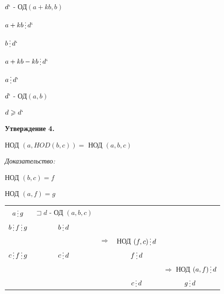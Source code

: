 \documentclass[12pt]{article}
\begin{document}
\begin{enumerate}
          $d`$ - ОД$(a+kb,b)$\par
          $a+kb \mathop{\raisebox{-2pt}{\vdots}} d`$\par
          $b \mathop{\raisebox{-2pt}{\vdots}} d`$\par
          $a +kb-kb \mathop{\raisebox{-2pt}{\vdots}} d`$\par
          $a \mathop{\raisebox{-2pt}{\vdots}} d`$\par
          $d`$ - ОД$(a,b)$\par
          $d \geqslant d`$\par
\end{enumerate}\par

\textbf{Утверждение 4.}\par
НОД $(a, HOD(b,c)) =$ НОД $(a,b,c)$\par
\textit{Доказательство:}\par
НОД $(b,c) = f$\par
НОД $(a,f) = g$\par
\begin{tabular}{ccccc}
    $a \mathop{\raisebox{-2pt}{\vdots}} g$                                    & $\sqsupset d$ - ОД $(a,b,c)$                                                                                                                                                                    \\
    $b \mathop{\raisebox{-2pt}{\vdots}} f \mathop{\raisebox{-2pt}{\vdots}} g$ & $b \mathop{\raisebox{-2pt}{\vdots}} d$                                                                                                                                                          \\
                                                                              &                                        & $\Rightarrow$                          & НОД $(f,c) \mathop{\raisebox{-2pt}{\vdots}} d$                                                                \\
    $c \mathop{\raisebox{-2pt}{\vdots}} f \mathop{\raisebox{-2pt}{\vdots}} g$ & $c \mathop{\raisebox{-2pt}{\vdots}} d$
                                                                              &                                        & $f \mathop{\raisebox{-2pt}{\vdots}} d$                                                                                                                 \\
                                                                              &                                        &                                        &                                                & $\Rightarrow$ НОД $(a,f) \mathop{\raisebox{-2pt}{\vdots}} d$ \\
                                                                              &                                        &                                        & $c \mathop{\raisebox{-2pt}{\vdots}} d$         & $g \mathop{\raisebox{-2pt}{\vdots}} d$                       \\
\end{tabular}\par
\end{document}
